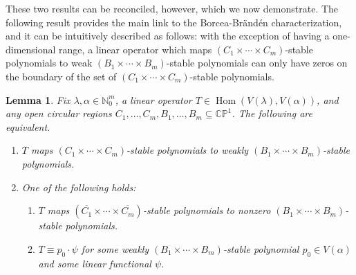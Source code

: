 \documentclass{article}
\newtheorem{lemma}[theorem]{Lemma}
\theoremstyle{definition}
\theoremstyle{plain}
\newcommand{\N}{\mathbb{N}}
\newcommand{\CP}{\mathbb{CP}}
\DeclareMathOperator{\Hom}{Hom}
\begin{document}
These two results can be reconciled, however, which we now demonstrate. The following result provides the main link to the Borcea-Br{\"a}nd{\'e}n characterization, and it can be intuitively described as follows: with the exception of having a one-dimensional range, a linear operator which maps $(C_1 \times \cdots \times C_m)$-stable polynomials to weak $(B_1 \times \cdots \times B_m)$-stable polynomials can only have zeros on the boundary of the set of $(C_1 \times \cdots \times C_m)$-stable polynomials.

\begin{lemma}\label{bb_Clink}
    Fix $\lambda,\alpha \in \N_0^m$, a linear operator $T \in \Hom(V(\lambda),V(\alpha))$, and any open circular regions $C_1,\ldots,C_m,B_1,\ldots,B_m \subseteq \CP^1$. The following are equivalent.
    \begin{enumerate}[label=(\roman*)]
        \item $T$ maps $(C_1 \times \cdots \times C_m)$-stable polynomials to weakly $(B_1 \times \cdots \times B_m)$-stable polynomials.
        \item One of the following holds:
            \begin{enumerate}[label=(\alph*)]
                \item $T$ maps $(\overline{C_1} \times \cdots \times \overline{C_m})$-stable polynomials to nonzero $(B_1 \times \cdots \times B_m)$-stable polynomials.
                \item $T \equiv p_0 \cdot \psi$ for some weakly $(B_1 \times \cdots \times B_m)$-stable polynomial $p_0 \in V(\alpha)$ and some linear functional $\psi$.
            \end{enumerate}
    \end{enumerate}
\end{lemma}
\end{document}

